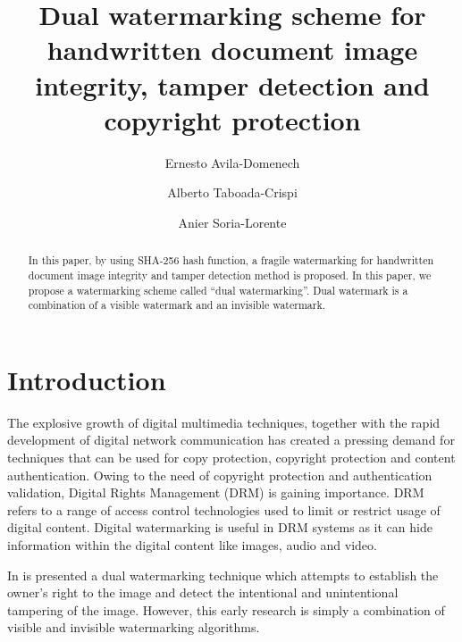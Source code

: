 \documentclass[runningheads]{llncs}
\begin{document}
%
\title{Dual watermarking scheme for handwritten document image integrity, tamper detection and copyright protection}
%
%
\author{Ernesto Avila-Domenech \and
Alberto Taboada-Crispi \and
Anier Soria-Lorente}
%
%
%
\maketitle              %
%
\begin{abstract}
In this paper, by using SHA-256 hash function, a fragile watermarking for handwritten document image integrity and tamper detection method is proposed. In this paper, we propose a watermarking scheme called “dual watermarking”. Dual watermark is a combination of a visible watermark and an invisible watermark.

\end{abstract}
%
%
%
\section{Introduction}
The explosive growth of digital multimedia techniques, together with the rapid development of digital network communication has created a pressing demand for techniques that can be used for copy protection, copyright protection and content authentication. Owing to the need of copyright protection and authentication validation, Digital Rights Management (DRM) is gaining importance. DRM refers to a range of access control technologies used to limit or restrict usage of digital content. Digital watermarking is useful in DRM systems as it can hide information within the digital content like images, audio and video.

In \cite{mohanty1999dual} is presented a dual watermarking technique which attempts to establish the owner’s right to the image and detect the intentional and unintentional tampering of the image. However, this early research is simply a combination of visible and invisible watermarking algorithms.
\end{document}
